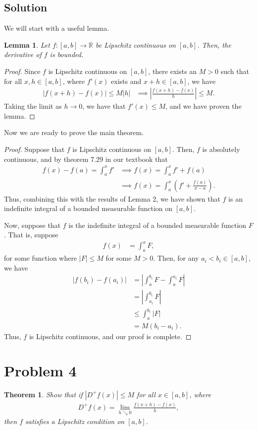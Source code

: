 \documentclass[10pt,a4paper]{article}
\theoremstyle{theorem}
\newtheorem{theorem}{Theorem}
\newtheorem{lemma}{Lemma}
\theoremstyle{definition}
\begin{document}
\subsection*{Solution}
We will start with a useful lemma.
\begin{lemma}
Let $f:[a, b] \to \mathbb{R}$ be Lipschitz continuous on $[a, b]$. Then, the derivative of $f$ is bounded.
\end{lemma}

\begin{proof}
Since $f$ is Lipschitz continuous on $[a, b]$, there exists an $M > 0$ such that for all $x, h \in [a, b]$, where $f'(x)$ exists and $x + h \in [a, b]$, we have
\begin{align*}
|f(x + h) - f(x)| \leq M |h| &\implies \left| \frac{f(x+h) - f(x)}{h} \right| \leq M.
\end{align*}
Taking the limit as $h \to 0$, we have that $f'(x) \leq M$, and we have proven the lemma.
\end{proof}

Now we are ready to prove the main theorem.
\begin{proof}
Suppose that $f$ is Lipschitz continuous on $[a, b]$. Then, $f$ is absolutely continuous, and by theorem 7.29 in our textbook that
\begin{align*}
f(x) - f(a) = \int_a^x f' &\implies f(x) = \int_a^x f' + f(a)\\
&\implies f(x) = \int_a^x \left(f' + \frac{f(a)}{x - a}\right).
\end{align*}
Thus, combining this with the results of Lemma 2, we have shown that $f$ is an indefinite integral of a bounded measurable function on $[a, b]$.

Now, suppose that $f$ is the indefinite integral of a bounded measurable function $F$. That is, suppose
\begin{align*}
f(x) &= \int_a^x F,
\end{align*}
for some function where $|F| \leq M$ for some $M > 0$. Then, for any $a_i < b_i \in [a, b]$, we have
\begin{align*}
|f(b_i) - f(a_i)| &= \left|\int_a^{b_i} F - \int_a^{a_i} F \right|\\
&= \left|\int_{a_i}^{b_i} F \right|\\
&\leq \int_a^{b_i} |F|\\
&= M(b_i - a_i).
\end{align*}
Thus, $f$ is Lipschitz continuous, and our proof is complete.
\end{proof}

\section*{Problem 4}
\begin{theorem}
Show that if $|D^+ f(x)| \leq M$ for all $x \in [a, b]$, where
\begin{align*}
D^+ f(x) = \lim_{h \searrow 0} \frac{f(x + h) - f(x)}{h},
\end{align*}
then $f$ satisfies a Lipschitz condition on $[a, b]$.
\end{theorem}
\end{document}
